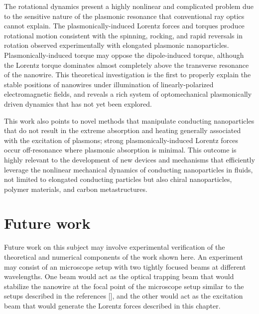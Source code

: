 The rotational dynamics present a highly nonlinear and complicated problem due to the sensitive nature of the plasmonic resonance that conventional ray optics cannot explain. The plasmonically-induced Lorentz forces and torques produce rotational motion consistent with the spinning, rocking, and rapid reversals in rotation observed experimentally with elongated plasmonic nanoparticles.  Plasmonically-induced torque may oppose the dipole-induced torque, although the Lorentz torque dominates almost completely above the transverse resonance of the nanowire. This theoretical investigation is the first to properly explain the stable positions of nanowires under illumination of linearly-polarized electromagnetic fields, and reveals a rich system of optomechanical plasmonically driven dynamics that has not yet been explored.

This work also points to novel methods that manipulate conducting nanoparticles that do not result in the extreme absorption and heating generally associated with the excitation of plasmons; strong plasmonically-induced Lorentz forces occur off-resonance where plasmonic absorption is minimal. This outcome is highly relevant to the development of new devices and mechanisms that efficiently leverage the nonlinear mechanical dynamics of conducting nanoparticles in fluids, not limited to elongated conducting particles but also chiral nanoparticles, polymer materials, and carbon metastructures.

\section{Future work}
Future work on this subject may involve experimental verification of the theoretical and numerical components of the work shown here. An experiment may consist of an microscope setup with two tightly focused beams at different wavelengths. One beam would act as the optical trapping beam that would stabilize the nanowire at the focal point of the microscope setup similar to the setups described in the references [\cite{Ashkin2001, Lee2012, Kuo2001, Lang2003}], and the other would act as the excitation beam that would generate the Lorentz forces described in this chapter.